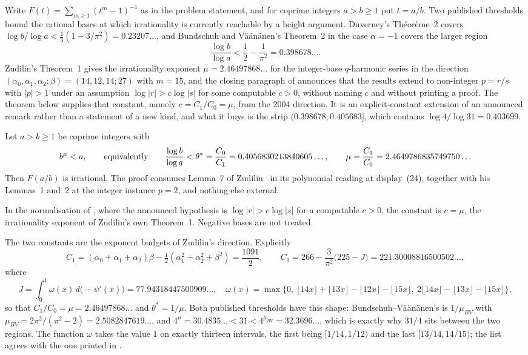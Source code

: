 \documentclass[11pt]{article}
\begin{document}
Write $F(t)=\sum_{m\ge1}(t^m-1)^{-1}$ as in the problem statement, and for
coprime integers $a>b\ge1$ put $t=a/b$.  Two published thresholds bound the
rational bases at which irrationality is currently reachable by a height
argument.  Duverney's Th\'eor\`eme~2 \cite[Th.~2, p.~174]{duverney1996} covers
$\log b/\log a<\tfrac13(1-3/\pi^2)=0.23207\ldots$, and Bundschuh and
V\"a\"an\"anen's Theorem~2 in the case $\alpha=-1$ \cite[Thm.~2,
p.~177]{bv1994} covers the larger region
\[
  \frac{\log b}{\log a}<\frac12-\frac1{\pi^2}=0.398678\ldots .
\]
Zudilin's Theorem~1 \cite[Thm.~1]{zudilin2004} gives the irrationality
exponent $\mu=2.46497868\ldots$ for the integer-base $q$-harmonic series in the
direction $(\alpha_0,\alpha_1,\alpha_2;\beta)=(14,12,14;27)$ with $m=15$, and
the closing paragraph of \cite[\S2]{zudilin2016} announces that the results
extend to non-integer $p=r/s$ with $|p|>1$ under an assumption
$\log|r|>c\log|s|$ for some computable $c>0$, without naming $c$ and without
printing a proof.  The theorem below supplies that constant, namely
$c=C_1/C_0=\mu$, from the 2004 direction.  It is an explicit-constant extension
of an announced remark rather than a statement of a new kind, and what it buys
is the strip $(0.398678,0.405683]$, which contains $\log4/\log31=0.403699$.

\begin{theorem}
\label{res:rational-base-threshold}
Let $a>b\ge1$ be coprime integers with
\[
  b^{\mu}<a,
  \qquad\hbox{equivalently}\qquad
  \frac{\log b}{\log a}<\theta^*=\frac{C_0}{C_1}=0.4056830213840605\ldots,
  \qquad \mu=\frac{C_1}{C_0}=2.4649786835749750\ldots
\]
Then $F(a/b)$ is irrational.  The proof consumes Lemma~7 of
Zudilin~\cite{zudilin2004} in its polynomial reading at display~(24), together
with his Lemmas~1 and~2 at the integer instance $p=2$, and nothing else
external.
\end{theorem}

\noindent In the normalisation of \cite[\S2]{zudilin2016}, where the announced
hypothesis is $\log|r|>c\log|s|$ for a computable $c>0$, the constant is
$c=\mu$, the irrationality exponent of Zudilin's own Theorem~1.  Negative bases
are not treated.

The two constants are the exponent budgets of Zudilin's direction.  Explicitly
\[
  C_1=(\alpha_0+\alpha_1+\alpha_2)\beta-\tfrac12(\alpha_1^2+\alpha_2^2+\beta^2)
     =\frac{1091}2,
  \qquad
  C_0=266-\frac3{\pi^2}\bigl(225-J\bigr)=221.30008816500502\ldots,
\]
where
\[
  J=\int_0^1\omega(x)\,d\bigl(-\psi'(x)\bigr)
   =77.94318447500909\ldots,
  \quad
  \omega(x)=\max\bigl\{0,\ \lfloor14x\rfloor+\lfloor13x\rfloor-\lfloor12x\rfloor-\lfloor15x\rfloor,\
  2\lfloor14x\rfloor-\lfloor13x\rfloor-\lfloor15x\rfloor\bigr\},
\]
so that $C_1/C_0=\mu=2.46497868\ldots$ and $\theta^*=1/\mu$.  Both published
thresholds have this shape: Bundschuh--V\"a\"an\"anen's is $1/\mu_{BV}$ with
$\mu_{BV}=2\pi^2/(\pi^2-2)=2.5082847619\ldots$, and $4^{\mu}=30.4835\ldots<31<4^{\mu_{BV}}=32.3696\ldots$,
which is exactly why $31/4$ sits between the two regions.  The function
$\omega$ takes the value $1$ on exactly thirteen intervals, the first being
$[1/14,1/12)$ and the last $[13/14,14/15)$; the list agrees with the one
printed in \cite{zudilin2004}.
\end{document}
